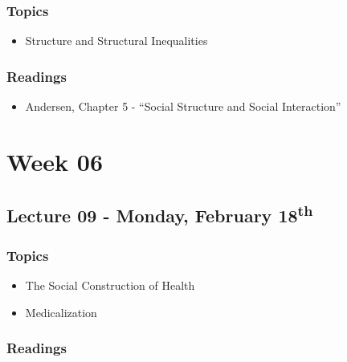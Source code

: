 \documentclass[]{book}
\providecommand{\tightlist}{%
  \setlength{\itemsep}{0pt}\setlength{\parskip}{0pt}}
\begin{document}
\hypertarget{topics-9}{%
\subsubsection*{Topics}\label{topics-9}}

\begin{itemize}
\tightlist
\item
  Structure and Structural Inequalities
\end{itemize}

\hypertarget{readings-8}{%
\subsubsection*{Readings}\label{readings-8}}

\begin{itemize}
\tightlist
\item
  Andersen, Chapter 5 - ``Social Structure and Social Interaction''
\end{itemize}

\hypertarget{week-06}{%
\section*{Week 06}\label{week-06}}

\hypertarget{lecture-09---monday-february-18th}{%
\subsection*{\texorpdfstring{Lecture 09 - Monday, February 18\textsuperscript{th}}{Lecture 09 - Monday, February 18th}}\label{lecture-09---monday-february-18th}}

\hypertarget{topics-10}{%
\subsubsection*{Topics}\label{topics-10}}

\begin{itemize}
\tightlist
\item
  The Social Construction of Health
\item
  Medicalization
\end{itemize}

\hypertarget{readings-9}{%
\subsubsection*{Readings}\label{readings-9}}
\end{document}
